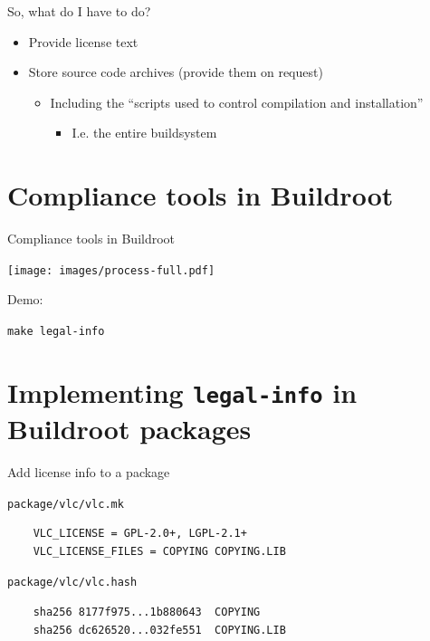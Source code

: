 \documentclass[xetex,table,table]{beamer}
\begin{document}
\begin{frame}{So, what do I have to do?}
  \begin{itemize}
  \item Provide license text
  \item Store source code archives (provide them on request)
    \begin{itemize}
    \item Including the ``scripts used to control compilation and
      installation''
      \begin{itemize}
      \item I.e. the entire buildsystem
      \end{itemize}
    \end{itemize}
  \end{itemize}
\end{frame}


\section{Compliance tools in Buildroot}

\begin{frame}{Compliance tools in Buildroot}
  \begin{center}
    \texttt{[image: images/process-full.pdf]}
  \end{center}
\end{frame}

\begin{frame}[standout]
  Demo:

  {\tt make legal-info}
\end{frame}


\section[Implementing {\tt legal-info}\\in Buildroot packages]
        {Implementing {\tt legal-info}  in Buildroot packages}

\begin{frame}[fragile]{Add license info to a package}

  {\tt package/vlc/vlc.mk}
  \begin{verbatim}
    VLC_LICENSE = GPL-2.0+, LGPL-2.1+
    VLC_LICENSE_FILES = COPYING COPYING.LIB
  \end{verbatim}

  {\tt package/vlc/vlc.hash}
  \begin{verbatim}
    sha256 8177f975...1b880643  COPYING
    sha256 dc626520...032fe551  COPYING.LIB
  \end{verbatim}
\end{frame}
\end{document}
